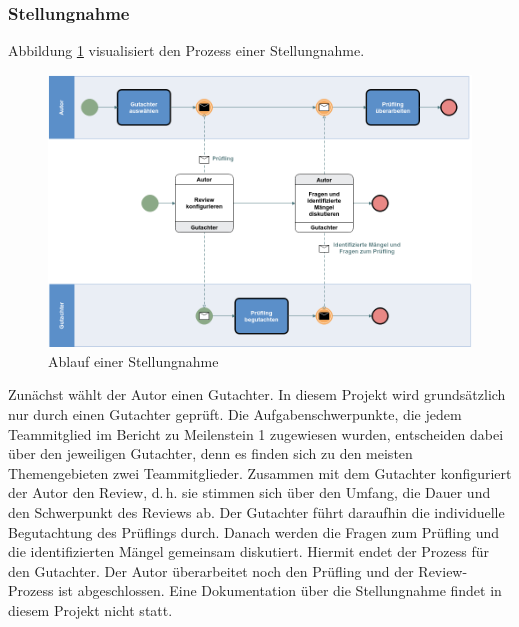 \documentclass[a4paper,11pt,listof=numbered,glossary=totoc,parskip=half,toc=bib]{scrreprt}
\newcommand{\dash}{\mbox{d.\,h.}\xspace}
\begin{document}
\subsubsection{Stellungnahme}
Abbildung \ref{fig:stellungnahme} visualisiert den Prozess einer Stellungnahme. 
	\begin{figure}
		\centering
		\includegraphics[width=\textwidth]{stellungnahme.png}
		\caption{Ablauf einer Stellungnahme}
		\label{fig:stellungnahme}
	\end{figure}
Zunächst wählt der Autor einen Gutachter. In diesem Projekt wird grundsätzlich nur durch einen Gutachter geprüft. Die Aufgabenschwerpunkte, die jedem Teammitglied im Bericht zu Meilenstein 1 zugewiesen wurden, entscheiden dabei über den jeweiligen Gutachter, denn es finden sich zu den meisten Themengebieten zwei Teammitglieder. Zusammen mit dem Gutachter konfiguriert der Autor den Review, \dash sie stimmen sich über den Umfang, die Dauer und den Schwerpunkt des Reviews ab. Der Gutachter führt daraufhin die individuelle Begutachtung des Prüflings durch. Danach werden die Fragen zum Prüfling und die identifizierten Mängel gemeinsam diskutiert. Hiermit endet der Prozess für den Gutachter. Der Autor überarbeitet noch den Prüfling und der Review-Prozess ist abgeschlossen. Eine Dokumentation über die Stellungnahme findet in diesem Projekt nicht statt.
\end{document}
